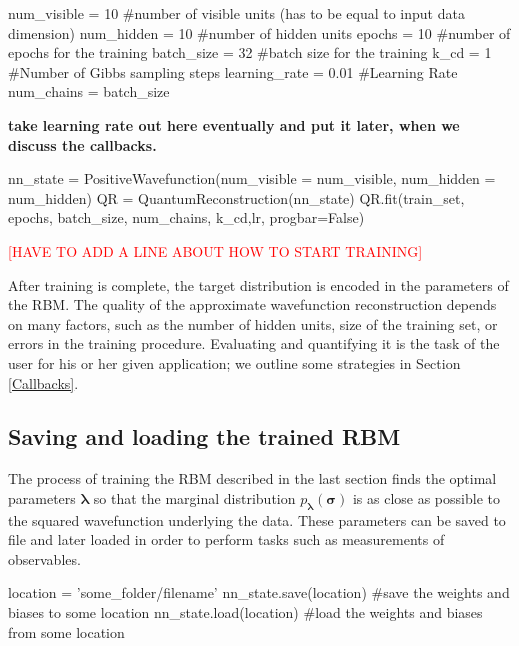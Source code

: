 \documentclass[submission, Phys]{SciPost}
\begin{document}
\begin{python}
num_visible = 10 #number of visible units (has to be equal to input data dimension)
num_hidden = 10 #number of hidden units
epochs = 10 #number of epochs for the training
batch_size = 32 #batch size for the training
k_cd = 1 #Number of Gibbs sampling steps
learning_rate = 0.01 #Learning Rate
num_chains = batch_size
\end{python}

\textbf{take learning rate out here eventually and put it later, when we discuss the callbacks.}

\begin{python}
nn_state = PositiveWavefunction(num_visible = num_visible,
						                    num_hidden = num_hidden)
QR = QuantumReconstruction(nn_state)
QR.fit(train_set, epochs, batch_size, num_chains, k_cd,lr, progbar=False)
\end{python}

\textcolor{red}{[HAVE TO ADD A LINE ABOUT HOW TO START TRAINING]}

After training is complete, the target distribution is encoded in the parameters of the RBM. 
The quality of the approximate wavefunction reconstruction depends on many factors, such as the number of hidden units, size of the training set, or errors in the training procedure.
Evaluating and quantifying it is the task of the user for his or her given application; we outline some strategies in Section \ref{Callbacks}.  

\subsection{Saving and loading the trained RBM}

The process of training the RBM described in the last section finds the optimal parameters $\bm{\lambda}$ so that 
the marginal distribution $p_{\bm{\lambda}} ( \bm{\sigma})$ is as close as possible to the squared wavefunction 
underlying the data. These parameters can be saved to file and later loaded in order to perform tasks such as measurements of observables.

\begin{python}
location = 'some_folder/filename'
nn_state.save(location) #save the weights and biases to some location
nn_state.load(location) #load the weights and biases from some location
\end{python}
\end{document}
